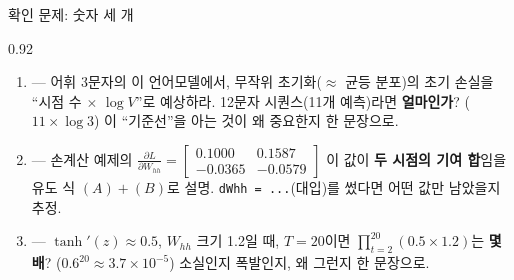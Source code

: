 \begin{frame}[fragile]{확인 문제: 숫자 세 개}
\begin{center}\begin{varwidth}{0.92\textwidth}
  \begin{enumerate}
    \item {} --- 어휘 3문자의 이 언어모델에서, 무작위
      초기화($\approx$ 균등 분포)의 초기 손실을 ``시점 수 $\times$
      $\log V$''로 예상하라. 12문자 시퀀스(11개 예측)라면
      \textbf{얼마인가}? ($11 \times \log 3$) 이 ``기준선''을
      아는 것이 왜 중요한지 한 문장으로.
    \item {} --- 손계산 예제의
      $\frac{\partial L}{\partial W_{hh}} = \begin{bmatrix}
      0.1000 & 0.1587 \\ -0.0365 & -0.0579 \end{bmatrix}$ 이 값이
      \textbf{두 시점의 기여 합}임을 유도 식 $(A)+(B)$로 설명.
      \verb|dWhh = ...|(대입)를 썼다면 어떤 값만 남았을지 추정.
    \item {} --- $\tanh'(z) \approx 0.5$, $W_{hh}$ 크기
      1.2일 때, $T=20$이면 $\prod_{t=2}^{20} (0.5 \times 1.2)$는
      \textbf{몇 배}? ($0.6^{20} \approx 3.7 \times 10^{-5}$)
      소실인지 폭발인지, 왜 그런지 한 문장으로.
  \end{enumerate}
\end{varwidth}\end{center}
\end{frame}
